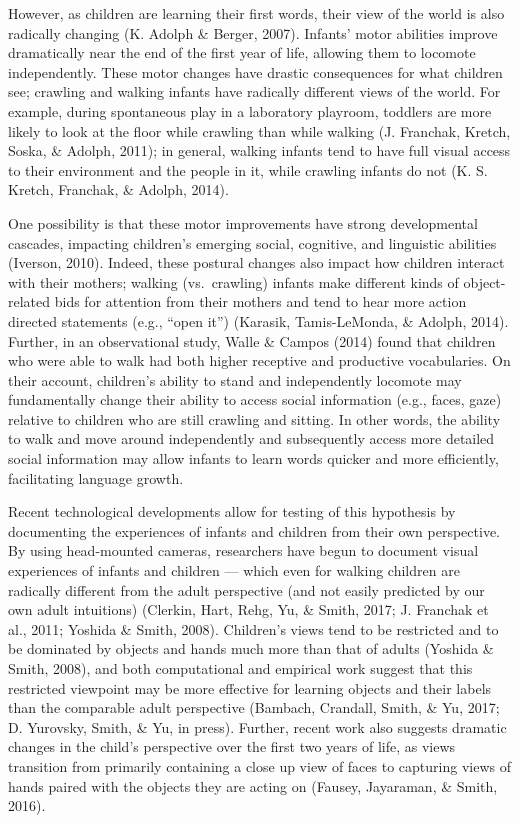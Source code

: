 \documentclass[10pt, letterpaper]{article}
\begin{document}
However, as children are learning their first words, their view of the
world is also radically changing (K. Adolph \& Berger, 2007). Infants'
motor abilities improve dramatically near the end of the first year of
life, allowing them to locomote independently. These motor changes have
drastic consequences for what children see; crawling and walking infants
have radically different views of the world. For example, during
spontaneous play in a laboratory playroom, toddlers are more likely to
look at the floor while crawling than while walking (J. Franchak,
Kretch, Soska, \& Adolph, 2011); in general, walking infants tend to
have full visual access to their environment and the people in it, while
crawling infants do not (K. S. Kretch, Franchak, \& Adolph, 2014).

One possibility is that these motor improvements have strong
developmental cascades, impacting children's emerging social, cognitive,
and linguistic abilities (Iverson, 2010). Indeed, these postural changes
also impact how children interact with their mothers; walking
(vs.~crawling) infants make different kinds of object-related bids for
attention from their mothers and tend to hear more action directed
statements (e.g., ``open it'') (Karasik, Tamis-LeMonda, \& Adolph,
2014). Further, in an observational study, Walle \& Campos (2014) found
that children who were able to walk had both higher receptive and
productive vocabularies. On their account, children's ability to stand
and independently locomote may fundamentally change their ability to
access social information (e.g., faces, gaze) relative to children who
are still crawling and sitting. In other words, the ability to walk and
move around independently and subsequently access more detailed social
information may allow infants to learn words quicker and more
efficiently, facilitating language growth.

Recent technological developments allow for testing of this hypothesis
by documenting the experiences of infants and children from their own
perspective. By using head-mounted cameras, researchers have begun to
document visual experiences of infants and children --- which even for
walking children are radically different from the adult perspective (and
not easily predicted by our own adult intuitions) (Clerkin, Hart, Rehg,
Yu, \& Smith, 2017; J. Franchak et al., 2011; Yoshida \& Smith, 2008).
Children's views tend to be restricted and to be dominated by objects
and hands much more than that of adults (Yoshida \& Smith, 2008), and
both computational and empirical work suggest that this restricted
viewpoint may be more effective for learning objects and their labels
than the comparable adult perspective (Bambach, Crandall, Smith, \& Yu,
2017; D. Yurovsky, Smith, \& Yu, in press). Further, recent work also
suggests dramatic changes in the child's perspective over the first two
years of life, as views transition from primarily containing a close up
view of faces to capturing views of hands paired with the objects they
are acting on (Fausey, Jayaraman, \& Smith, 2016).
\end{document}
